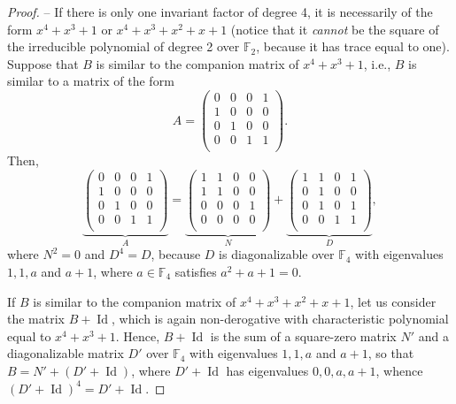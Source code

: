 \documentclass{amsart}
\DeclareMathOperator{\Id}{Id}
\def\FF{\mathbb{F}}
\theoremstyle{definition}
\theoremstyle{remark}
\numberwithin{equation}{section}
\begin{document}
\begin{proof}
\noindent -- If there is only one invariant factor of degree 4, it is necessarily of the form $x^4+x^3+1$ or $x^4+x^3+x^2+x+1$ (notice that it {\it cannot} be the square of the irreducible polynomial of degree 2 over $\FF_2$, because it has trace equal to one). Suppose that $B$ is similar to the companion matrix of $x^4+x^3+1$, i.e., $B$ is similar to a matrix of the form
$$
A=\left(
    \begin{array}{cccc}
      0 & 0 & 0 & 1 \\
      1 & 0 & 0 & 0 \\
      0 & 1 & 0 & 0 \\
      0 & 0 & 1 & 1 \\
    \end{array}
  \right).
$$
Then,
$$
\underbrace{\left(
    \begin{array}{cccc}
      0 & 0 & 0 & 1 \\
      1 & 0 & 0 & 0 \\
      0 & 1 & 0 & 0 \\
      0 & 0 & 1 & 1 \\
    \end{array}
  \right)}_A=\underbrace{\left(
    \begin{array}{cccc}
      1 & 1 & 0 & 0 \\
      1 & 1 & 0 & 0 \\
      0 & 0 & 0 & 1 \\
      0 & 0 & 0 & 0 \\
    \end{array}
  \right)}_N+\underbrace{\left(
    \begin{array}{cccc}
      1 & 1 & 0 & 1 \\
      0 & 1 & 0 & 0 \\
      0 & 1 & 0 & 1 \\
      0 & 0 & 1 & 1 \\
    \end{array}
  \right)}_D,
$$
where $N^2=0$ and $D^4=D$, because $D$ is diagonalizable over $\FF_4$ with eigenvalues $1,1, a$ and $a+1$, where $a\in \FF_4$ satisfies $a^2+a+1=0$.

If $B$ is similar to the companion matrix of $x^4+x^3+x^2+x+1$, let us consider the matrix $B+\Id$, which is again non-derogative with characteristic polynomial equal to $x^4+x^3+1$. Hence, $B+\Id$ is the sum of a square-zero matrix $N'$ and a diagonalizable matrix $D'$ over $\FF_4$ with eigenvalues $1,1, a$ and $a+1$, so that $B=N'+(D'+\Id)$, where $D'+\Id$ has eigenvalues $0,0, a, a+1$, whence $(D'+\Id)^4=D'+\Id$.


\end{proof}
\end{document}
